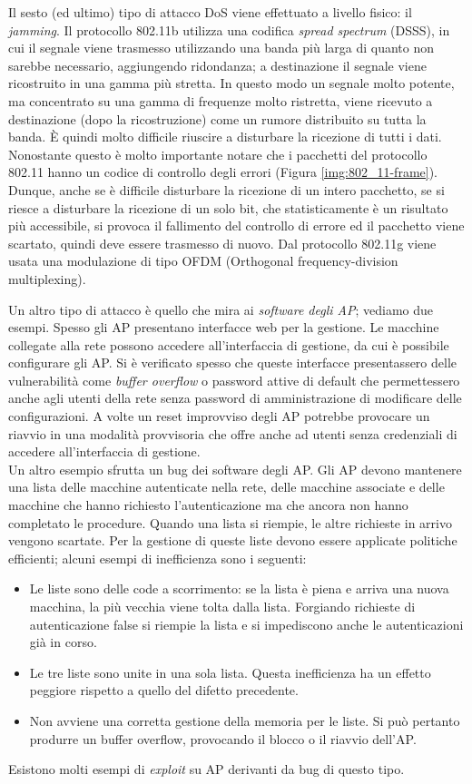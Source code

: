 Il sesto (ed ultimo) tipo di attacco DoS viene effettuato a livello fisico: il \textit{jamming}. Il protocollo 802.11b utilizza una codifica \textit{spread spectrum} (DSSS), in cui il segnale viene trasmesso utilizzando una banda più larga di quanto non sarebbe necessario, aggiungendo ridondanza; a destinazione il segnale viene ricostruito in una gamma più stretta. In questo modo un segnale molto potente, ma concentrato su una gamma di frequenze molto ristretta, viene ricevuto a destinazione (dopo la ricostruzione) come un rumore distribuito su tutta la banda. È quindi molto difficile riuscire a disturbare la ricezione di tutti i dati. Nonostante questo è molto importante notare che i pacchetti del protocollo 802.11 hanno un codice di controllo degli errori (Figura \ref{img:802_11-frame}). Dunque, anche se è difficile disturbare la ricezione di un intero pacchetto, se si riesce a disturbare la ricezione di un solo bit, che statisticamente è un risultato più accessibile, si provoca il fallimento del controllo di errore ed il pacchetto viene scartato, quindi deve essere trasmesso di nuovo. Dal protocollo 802.11g viene usata una modulazione di tipo OFDM (Orthogonal frequency-division multiplexing).

Un altro tipo di attacco è quello che mira ai \textit{software degli AP}; vediamo due esempi. Spesso gli AP presentano interfacce web per la gestione. Le macchine collegate alla rete possono accedere all'interfaccia di gestione, da cui è possibile configurare gli AP. Si è verificato spesso che queste interfacce presentassero delle vulnerabilità come \textit{buffer overflow} o password attive di default che permettessero anche agli utenti della rete senza password di amministrazione di modificare delle configurazioni. A volte un reset improvviso degli AP potrebbe provocare un riavvio in una modalità provvisoria che offre anche ad utenti senza credenziali di accedere all'interfaccia di gestione.\\
Un altro esempio sfrutta un bug dei software degli AP. Gli AP devono mantenere una lista delle macchine autenticate nella rete, delle macchine associate e delle macchine che hanno richiesto l'autenticazione ma che ancora non hanno completato le procedure. Quando una lista si riempie, le altre richieste in arrivo vengono scartate. Per la gestione di queste liste devono essere applicate politiche efficienti; alcuni esempi di inefficienza sono i seguenti:
\begin{itemize}
	\item Le liste sono delle code a scorrimento: se la lista è piena e arriva una nuova macchina, la più vecchia viene tolta dalla lista. Forgiando richieste di autenticazione false si riempie la lista e si impediscono anche le autenticazioni già in corso.
	\item Le tre liste sono unite in una sola lista. Questa inefficienza ha un effetto peggiore rispetto a quello del difetto precedente.
	\item Non avviene una corretta gestione della memoria per le liste. Si può pertanto produrre un buffer overflow, provocando il blocco o il riavvio dell'AP.
\end{itemize}
Esistono molti esempi di \textit{exploit} su AP derivanti da bug di questo tipo.

